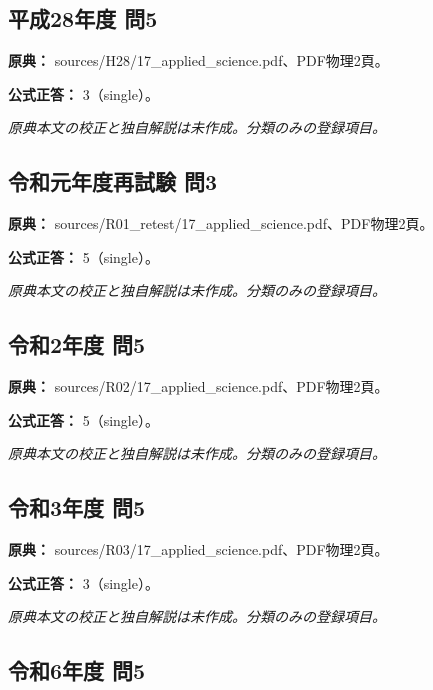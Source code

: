 \subsection{平成28年度 問5}
\label{q:h28-reg-applied-05}

\noindent\textbf{原典：} sources/H28/17\_applied\_science.pdf、PDF物理2頁。

\textbf{公式正答：} 3（single）。

\par\textit{原典本文の校正と独自解説は未作成。分類のみの登録項目。}

\subsection{令和元年度再試験 問3}
\label{q:r01-ret-applied-03}

\noindent\textbf{原典：} sources/R01\_retest/17\_applied\_science.pdf、PDF物理2頁。

\textbf{公式正答：} 5（single）。

\par\textit{原典本文の校正と独自解説は未作成。分類のみの登録項目。}

\subsection{令和2年度 問5}
\label{q:r02-reg-applied-05}

\noindent\textbf{原典：} sources/R02/17\_applied\_science.pdf、PDF物理2頁。

\textbf{公式正答：} 5（single）。

\par\textit{原典本文の校正と独自解説は未作成。分類のみの登録項目。}

\subsection{令和3年度 問5}
\label{q:r03-reg-applied-05}

\noindent\textbf{原典：} sources/R03/17\_applied\_science.pdf、PDF物理2頁。

\textbf{公式正答：} 3（single）。

\par\textit{原典本文の校正と独自解説は未作成。分類のみの登録項目。}

\subsection{令和6年度 問5}
\label{q:r06-reg-applied-05}

